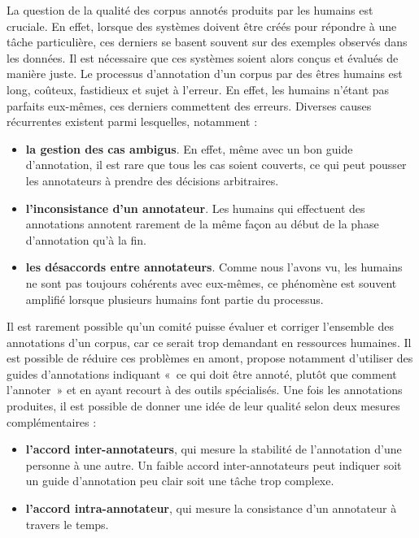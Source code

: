 \documentclass[PhD-Yoann-Dupont.tex]{subfiles}
\begin{document}
La question de la qualité des corpus annotés produits par les humains est cruciale. En effet, lorsque des systèmes doivent être créés pour répondre à une tâche particulière, ces derniers se basent souvent sur des exemples observés dans les données. Il est nécessaire que ces systèmes soient alors conçus et évalués de manière juste. Le processus d'annotation d'un corpus par des êtres humains est long, coûteux, fastidieux et sujet à l'erreur. En effet, les humains n'étant pas parfaits eux-mêmes, ces derniers commettent des erreurs. Diverses causes récurrentes existent parmi lesquelles, notamment :

\begin{itemize}
    \item \textbf{la gestion des cas ambigus}. En effet, même avec un bon guide d'annotation, il est rare que tous les cas soient couverts, ce qui peut pousser les annotateurs à prendre des décisions arbitraires.
    \item \textbf{l'inconsistance d'un annotateur}. Les humains qui effectuent des annotations annotent rarement de la même façon au début de la phase d'annotation qu'à la fin.
    \item \textbf{les désaccords entre annotateurs}. Comme nous l'avons vu, les humains ne sont pas toujours cohérents avec eux-mêmes, ce phénomène est souvent amplifié lorsque plusieurs humains font partie du processus.
\end{itemize}

Il est rarement possible qu'un comité puisse évaluer et corriger l'ensemble des annotations d'un corpus, car ce serait trop demandant en ressources humaines. Il est possible de réduire ces problèmes en amont, \citet{fort2009towards} propose notamment d'utiliser des guides d'annotations indiquant «\ ce qui doit être annoté, plutôt que comment l'annoter\ » et en ayant recourt à des outils spécialisés. Une fois les annotations produites, il est possible de donner une idée de leur qualité selon deux mesures complémentaires :

\begin{itemize}
    \item \textbf{l'accord inter-annotateurs}, qui mesure la stabilité de l'annotation d'une personne à une autre. Un faible accord inter-annotateurs peut indiquer soit un guide d'annotation peu clair soit une tâche trop complexe.
    \item \textbf{l'accord intra-annotateur}, qui mesure la consistance d'un annotateur à travers le temps.
\end{itemize}
\end{document}
